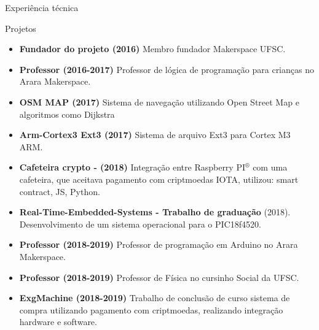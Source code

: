 \documentclass[]{mcdowellcv}
\begin{document}
	\begin{cvsection}{Experiência técnica}
		\begin{cvsubsection}{Projetos}{}{}
			\begin{itemize}
				\item \textbf{Fundador do projeto (2016)} Membro fundador Makerspace UFSC.
				\item \textbf{Professor (2016-2017)} Professor de lógica de programação para crianças no Arara Makerspace.
				\item \textbf{OSM MAP (2017)} Sistema de navegação utilizando Open Street Map e  algoritmos como  Dijkstra
				\item \textbf{Arm-Cortex3 Ext3 (2017)} Sistema de arquivo Ext3 para Cortex M3 ARM.
\item \textbf{Cafeteira crypto - (2018)} Integração entre Raspberry PI$^®$ com uma cafeteira, que aceitava pagamento com criptmoedas IOTA, utilizou: smart contract, JS, Python.
				\item \textbf{Real-Time-Embedded-Systems - Trabalho de graduação} (2018). Desenvolvimento de um sistema operacional para o PIC18f4520.
				\item \textbf{Professor (2018-2019)} Professor de programação em Arduino no Arara Makerspace.
				\item \textbf{Professor (2018-2019)} Professor de Física no cursinho Social da UFSC.
				\item \textbf{ExgMachine (2018-2019)} Trabalho de conclusão de curso sistema de compra utilizando pagamento com criptmoedas, realizando integração hardware e software.
			\end{itemize}
		\end{cvsubsection}
	\end{cvsection}
	
\end{document}
